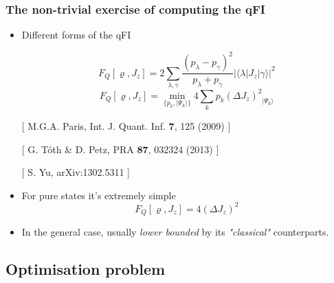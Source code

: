 \documentclass{beamer}
\newcommand{\ket}[1]{\ensuremath{\vert #1 \rangle}}
\newcommand{\braOket}[3]{\ensuremath{\langle #1 \vert #2 \vert #3 \rangle}}
\newcommand{\varian}[1]{\ensuremath{\left(\Delta #1 \right)^2}}
\newcommand{\citate}[1]{{\footnotesize{\color{gray}[ #1 ]}}

	}
\begin{document}
	\begin{frame}
		\frametitle{The non-trivial exercise of computing the qFI}

		\begin{itemize}
			\item<1-> Different forms of the qFI
				\begin{block}
					{}
					\small
					\[
						F_Q[\varrho,J_z]=2 \sum_{\lambda,\gamma} \frac{(p_\lambda-p_\gamma)^2}{p_\lambda+p_\gamma} |\braOket{\lambda}{J_z}{\gamma}|^2
					\]
					\[
					  F_Q[\varrho,J_z]=\min_{\{p_k,\ket{\Psi_k}\}} 4\sum_k p_k \varian{J_z}_{\ket{\Psi_k}}
					\]
				\end{block}
				\citate{M.G.A. Paris, Int. J. Quant. Inf. \textbf{7}, 125 (2009)}
				\citate{G. T\'oth \& D. Petz, PRA \textbf{87}, 032324 (2013)}
				\citate{S. Yu, arXiv:1302.5311}
				\vspace{2px}

			\item<2-> For pure states it's extremely simple
				{\small
				\[
					F_Q[\varrho,J_z] = 4\varian{J_z}
				\]
				}
			\item<3-> In the general case, usually \emph{\color{blue} lower bounded} by its \emph{"classical"} counterparts.

		\end{itemize}

	\end{frame}

	\subsection{Optimisation problem}
\end{document}
